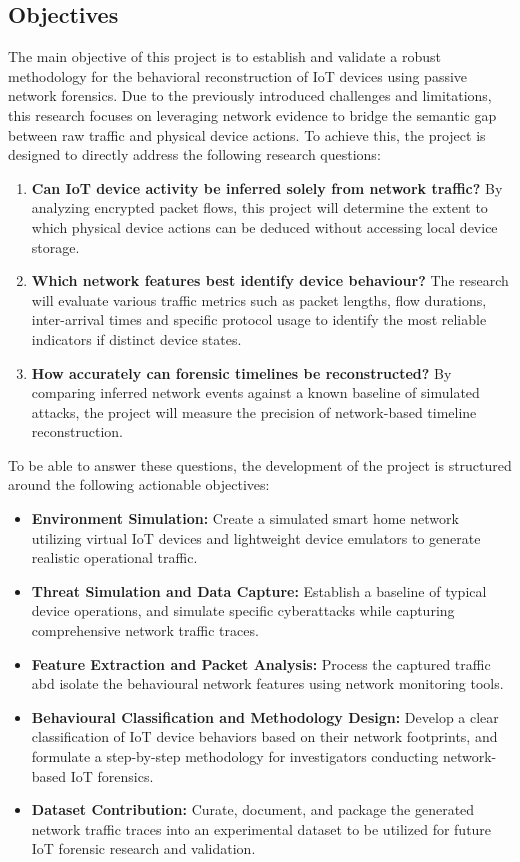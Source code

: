 \subsection{Objectives}
The main objective of this project is to establish and validate a robust methodology for the behavioral reconstruction of IoT devices using passive network forensics. Due to the previously introduced challenges and limitations, this research focuses on leveraging network evidence to bridge the semantic gap between raw traffic and physical device actions. To achieve this, the project is designed to directly address the following research questions: 

\begin{enumerate}
	\item \textbf{Can IoT device activity be inferred solely from network traffic?} By analyzing encrypted packet flows, this project will determine the extent to which physical device actions can be deduced without accessing local device storage. 
	\item \textbf{Which network features best identify device behaviour?} The research will evaluate various traffic metrics such as packet lengths, flow durations, inter-arrival times and specific protocol usage to identify the most reliable indicators if distinct device states. 
	\item \textbf{How accurately can forensic timelines be reconstructed?} By comparing inferred network events against a known baseline of simulated attacks, the project will measure the precision of network-based timeline reconstruction. 
\end{enumerate}

To be able to answer these questions, the development of the project is structured around the following actionable objectives: 

\begin{itemize}
	\item \textbf{Environment Simulation:} Create a simulated smart home network utilizing virtual IoT devices and lightweight device emulators to generate realistic operational traffic. 
	
	\item \textbf{Threat Simulation and Data Capture:} Establish a baseline of typical device operations, and simulate specific cyberattacks while capturing comprehensive network traffic traces.
	
	\item \textbf{Feature Extraction and Packet Analysis:} Process the captured traffic abd isolate the behavioural network features using network monitoring tools.
	
	\item \textbf{Behavioural Classification and Methodology Design:} Develop a clear classification of IoT device behaviors based on their network footprints, and formulate a step-by-step methodology for investigators conducting network-based IoT forensics.
	
	\item \textbf{Dataset Contribution:} Curate, document, and package the generated network traffic traces into an experimental dataset to be utilized for future IoT forensic research and validation.
\end{itemize}


